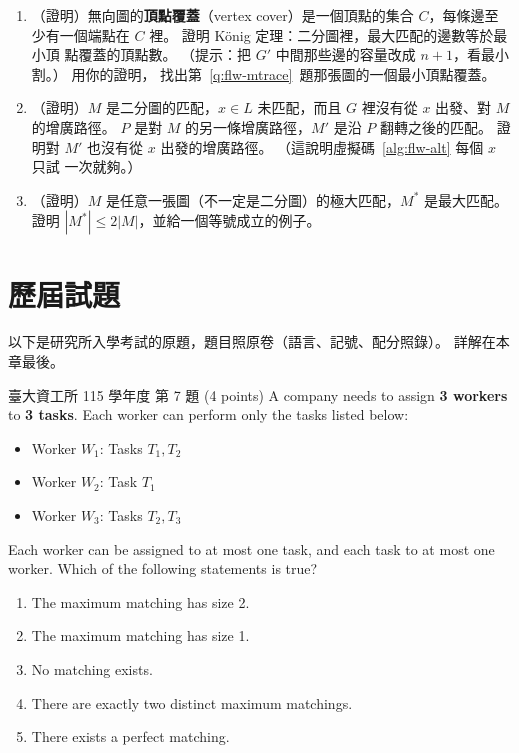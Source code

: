 \begin{enumerate}
\item \label{q:flw-konig}（證明）無向圖的\textbf{頂點覆蓋}（vertex cover）是一個頂點的集合
$C$，每條邊至少有一個端點在 $C$ 裡。 證明 König 定理：二分圖裡，最大匹配的邊數等於最小頂
點覆蓋的頂點數。 （提示：把 $G'$ 中間那些邊的容量改成 $n + 1$，看最小割。） 用你的證明，
找出第~\ref{q:flw-mtrace}~題那張圖的一個最小頂點覆蓋。

\item \label{q:flw-once}（證明）$M$ 是二分圖的匹配，$x \in L$ 未匹配，而且 $G$ 裡沒有從
$x$ 出發、對 $M$ 的增廣路徑。 $P$ 是對 $M$ 的另一條增廣路徑，$M'$ 是沿 $P$ 翻轉之後的匹配。
證明對 $M'$ 也沒有從 $x$ 出發的增廣路徑。 （這說明虛擬碼~\ref{alg:flw-alt} 每個 $x$ 只試
一次就夠。）

\item \label{q:flw-maximal}（證明）$M$ 是任意一張圖（不一定是二分圖）的極大匹配，$M^{*}$
是最大匹配。 證明 $|M^{*}| \le 2|M|$，並給一個等號成立的例子。
\end{enumerate}

\section{歷屆試題}
\label{sec:flw-pastexam}

以下是研究所入學考試的原題，題目照原卷（語言、記號、配分照錄）。 詳解在本章最後。

\begin{pastexam}[label={px:flw-1}]{臺大資工所 115 學年度 第 7 題}
(4 points) A company needs to assign \textbf{3 workers} to \textbf{3 tasks}. Each worker can
perform only the tasks listed below:
\begin{itemize}
\item Worker $W_1$: Tasks $T_1,T_2$
\item Worker $W_2$: Task $T_1$
\item Worker $W_3$: Tasks $T_2,T_3$
\end{itemize}
Each worker can be assigned to at most one task, and each task to at most one worker. Which of
the following statements is true?
\begin{enumerate}[label=(\Alph*), itemsep=1pt]
\item The maximum matching has size 2.
\item The maximum matching has size 1.
\item No matching exists.
\item There are exactly two distinct maximum matchings.
\item There exists a perfect matching.
\end{enumerate}
\end{pastexam}

